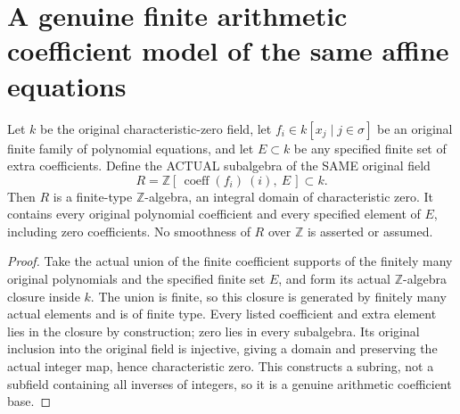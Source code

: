 \section{A genuine finite arithmetic coefficient model of the same affine equations}

\begin{definition}
\label{def:arithmetic-finite-coefficient-ring}
\leanok
Let $k$ be the original characteristic-zero field, let
$f_i\in k[x_j\mid j\in\sigma]$ be an original finite family of polynomial
equations, and let $E\subset k$ be any specified finite set of extra coefficients.
Define the ACTUAL subalgebra of the SAME original field
\[
 R=\mathbb Z[\,\operatorname{coeff}(f_i)\ (i),\ E\,]\subset k.
\]
Then $R$ is a finite-type $\mathbb Z$-algebra, an integral domain of
characteristic zero. It contains every original polynomial coefficient and
every specified element of $E$, including zero coefficients.
No smoothness of $R$ over $\mathbb Z$ is asserted or assumed.
\end{definition}
\begin{proof}
Take the actual union of the finite coefficient supports of the finitely
many original polynomials and the specified finite set $E$, and form its
actual $\mathbb Z$-algebra closure inside $k$. The union is finite, so this
closure is generated by finitely many actual elements and is of finite type.
Every listed coefficient and extra element lies in the closure by construction;
zero lies in every subalgebra. Its original inclusion into the original field
is injective, giving a domain and preserving the actual integer map, hence
characteristic zero. This constructs a subring, not a subfield containing
all inverses of integers, so it is a genuine arithmetic coefficient base.
\end{proof}

